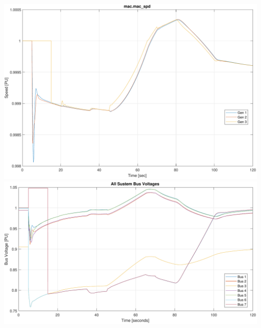 \documentclass[12pt]{article}
\begin{document}
\pagebreak
\includegraphics[width=\linewidth]{distinctSpeed}
\includegraphics[width=\linewidth]{distinctBusV}
\end{document}
